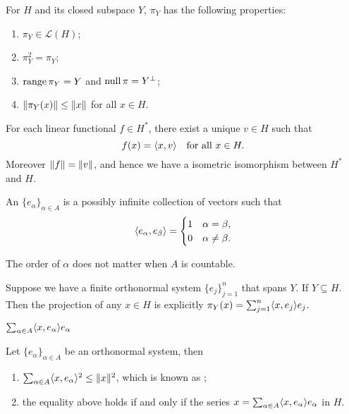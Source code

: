\begin{prop}
    For $H$ and its closed subspace $Y$, $\pi_Y$ has the following properties:
    \begin{enumerate}
        \item $\pi_Y \in \mathcal{L}(H)$;
        \item $\pi_Y^2 =\pi_Y$;
        \item $\operatorname{range} \pi_Y = Y$ and $\operatorname{null} \pi = Y^\perp$;
        \item $\lVert \pi_Y(x) \rVert \leq \lVert x \rVert$ for all $x \in H$.
    \end{enumerate}
\end{prop}

\begin{namedthm} \label{thm:Riesz-Hilbert}
    For each linear functional $f \in H^*$, there exist a unique $v \in H$ such that \[
        f(x) = \langle x, v \rangle\quad\text{for all }x\in H.
    \] Moreover $\lVert f \rVert = \lVert v \rVert$, and hence we have a isometric isomorphism between $H^*$ and $H$.
\end{namedthm}

An  $\{e_\alpha\}_{\alpha \in A}$ is a possibly infinite collection of vectors such that \[\langle e_\alpha, e_\beta \rangle = \begin{cases}
    1 & \alpha = \beta, \\
    0 & \alpha \neq \beta.\end{cases}
\]

The order of $\alpha$ does not matter when $A$ is countable.

\begin{prop}
    Suppose we have a finite orthonormal system $\{e_j\}_{j=1}^n$ that spans $Y$. If $Y \subseteq H$. Then the projection of any $x\in H$ is explicitly $\pi_Y(x) = \sum_{j=1}^n \langle x, e_j \rangle e_j$.
\end{prop}

\begin{prop}
    $\sum_{\alpha \in A}\langle x, e_\alpha \rangle e_\alpha$ 
\end{prop}

\begin{thm}
Let $\{e_\alpha\}_{\alpha\in A}$ be an orthonormal system, then \begin{enumerate}
    \item $\sum_{\alpha \in A} \langle x, e_\alpha \rangle^2 \leq \lVert x \rVert^2$, which is known as ;
    \item the equality above holds if and only if the series $x = \sum_{\alpha \in A}\langle x, e_\alpha \rangle e_\alpha$ in $H$.
\end{enumerate}
\end{thm}

